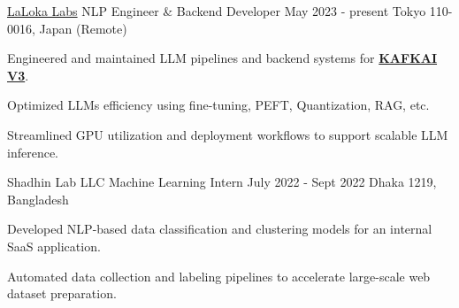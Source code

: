 \begin{cventries}
\cventry
    {\href{https://lalokalabs.co/en/}{LaLoka Labs}} %
    {NLP Engineer \& Backend Developer} %
    {May 2023 - present} %
    {Tokyo 110-0016, Japan (Remote)} %
    {
      \begin{cvitems} %
        \item{Engineered and maintained LLM pipelines and backend systems for \href{https://kafkai.com/}{\textcolor{Cerulean}{\textbf{KAFKAI V3}}}.}
        \item{Optimized LLMs efficiency using fine-tuning, PEFT, Quantization, RAG, etc.}
        \item{Streamlined GPU utilization and deployment workflows to support scalable LLM inference.}
      \end{cvitems}
    }


  \cventry
    {Shadhin Lab LLC} %
    {Machine Learning Intern} %
    {July 2022 - Sept 2022} %
    {Dhaka 1219, Bangladesh} %
    {
      \begin{cvitems} 
      \item{
        Developed NLP-based data classification and clustering models for an internal SaaS application.
      }
      \item{
        Automated data collection and labeling pipelines to accelerate large-scale web dataset preparation.      }
      \end{cvitems}
    }


\end{cventries}
